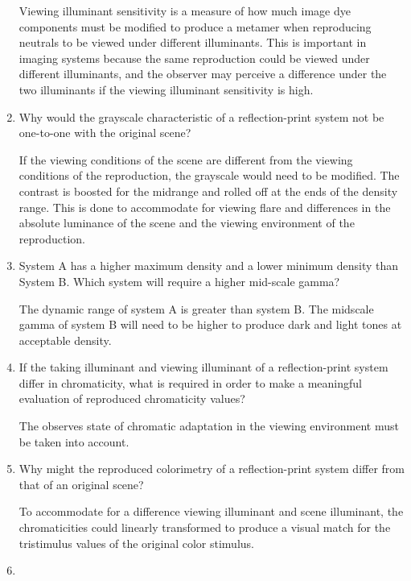 \begin{enumerate}
 \par Viewing illuminant sensitivity is a measure of how much image dye components must be modified to produce a metamer when reproducing neutrals to be viewed under different illuminants.   This is important in imaging systems because the same reproduction could be viewed under different illuminants, and the observer may perceive a difference under the two illuminants if the viewing illuminant sensitivity is high. \newline
 \item
 Why would the grayscale characteristic of a reflection-print system not be one-to-one with the original scene? \newline
 \par If the viewing conditions of the scene are different from the viewing conditions of the reproduction, the grayscale would need to be modified.  The contrast is boosted for the midrange and rolled off at the ends of the density range.  This is done to accommodate for viewing flare and differences in the absolute luminance of the scene and the viewing environment of the reproduction.
 \item
  System A has a higher maximum density and a lower minimum density than System B. Which system will require a higher mid-scale gamma? \newline
 \par The dynamic range of system A is greater than system B.  The midscale gamma of system B will need to be higher to produce dark and light tones at acceptable density.
 \item
  If the taking illuminant and viewing illuminant of a reflection-print system differ in chromaticity, what is required in order to make a meaningful evaluation of reproduced chromaticity values? \newline
 \par The observes state of chromatic adaptation in the viewing environment must be taken into account. \newline
 \item
  Why might the reproduced colorimetry of a reflection-print system differ from that of an original scene? \newline
 \par To accommodate for a difference viewing illuminant and scene illuminant, the chromaticities could linearly transformed to produce a visual match for the tristimulus values of the original color stimulus. \newline
 \item

\end{enumerate}
